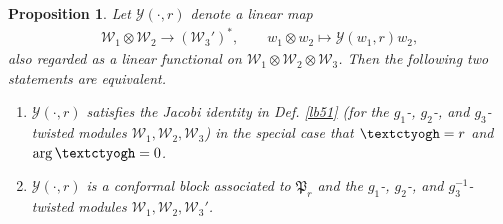 \documentclass[12pt,a4paper,notitlepage]{article}
\theoremstyle{definition}
\theoremstyle{plain}
\newtheorem{pp}[df]{Proposition}
\newcommand{\fk}{\mathfrak}
\newcommand{\mc}{\mathcal}
\newcommand{\tipaz}{\text{\textctyogh}}
\numberwithin{equation}{subsection}
\begin{document}
\begin{pp}\label{lb54}
Let $\mc Y(\cdot,r)$ denote a linear map
\begin{gather*}
\mc W_1\otimes \mc W_2\rightarrow (\mc W_3')^*,\qquad w_1\otimes w_2\mapsto\mc Y(w_1,r)w_2,	
\end{gather*}
also regarded as a linear functional on $\mc W_1\otimes\mc W_2\otimes \mc W_3$. Then the following two statements are equivalent.
\begin{enumerate}
\item $\mc Y(\cdot,r)$ satisfies the Jacobi identity in Def. \ref{lb51} (for the $g_1$-, $g_2$-, and $g_3$-twisted modules $\mc W_1,\mc W_2,\mc W_3$) in the special case that $\tipaz=r$ and $\arg\tipaz=0$.	
\item $\mc Y(\cdot,r)$ is a conformal block associated to $\fk P_r$ and the $g_1$-, $g_2$-, and $g_3^{-1}$-twisted modules $\mc W_1,\mc W_2,\mc W_3'$.
\end{enumerate}	
\end{pp}
\end{document}
